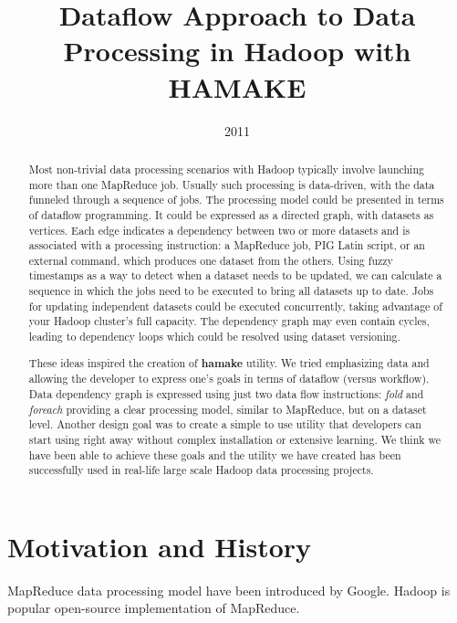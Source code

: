 \documentclass[10pt,conference,letterpaper]{IEEEtran}
\title{Dataflow Approach to Data Processing in Hadoop with HAMAKE}
\author{\IEEEauthorblockN{Vadim Zaliva}
\IEEEauthorblockA{Tristero Consulting\\
Email: lord@crocodile.org} \and \IEEEauthorblockN{Vladimir Orlov}
\IEEEauthorblockA{Codeminders\\
Email: vorl@codeminders.com}}
\date{2011}
\begin{document}
\lstset{language=XML,basicstyle=\tiny,markfirstintag=true,numbers=left, numberstyle=\tiny}

\maketitle

\begin{abstract}
  Most non-trivial data processing scenarios with Hadoop typically
  involve launching more than one MapReduce job. Usually such
  processing is data-driven, with the data funneled through a sequence
  of jobs. The processing model could be presented in terms of
  dataflow programming. It could be expressed as a directed graph,
  with datasets as vertices. Each edge indicates a dependency between
  two or more datasets and is associated with a processing
  instruction: a MapReduce job, PIG Latin script, or an external
  command, which produces one dataset from the others. Using fuzzy
  timestamps as a way to detect when a dataset needs to be updated, we
  can calculate a sequence in which the jobs need to be executed to
  bring all datasets up to date. Jobs for updating independent
  datasets could be executed concurrently, taking advantage of your
  Hadoop cluster's full capacity. The dependency graph may even
  contain cycles, leading to dependency loops which could be resolved
  using dataset versioning.

  These ideas inspired the creation of \textbf{hamake} utility. We
  tried emphasizing data and allowing the developer to express one's
  goals in terms of dataflow (versus workflow). Data dependency graph
  is expressed using just two data flow instructions: \emph{fold} and
  \emph{foreach} providing a clear processing model, similar to
  MapReduce, but on a dataset level. Another design goal was to create
  a simple to use utility that developers can start using right away
  without complex installation or extensive learning. We think we have
  been able to achieve these goals and the utility we have created has
  been successfully used in real-life large scale Hadoop data
  processing projects.
\end{abstract}

\section{Motivation and History}

MapReduce data processing model have been introduced by
Google\cite{dean2008map}. Hadoop\cite{bialecki2005hadoop} is popular
open-source implementation of MapReduce.
\end{document}
